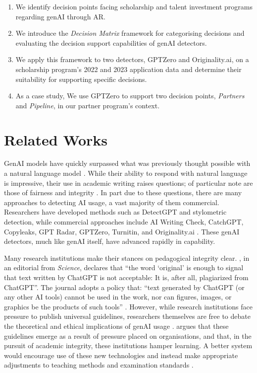\begin{enumerate}
    \item We identify decision points facing scholarship and talent investment programs regarding genAI through AR.
    \item We introduce the \emph{Decision Matrix} framework for categorising decisions and evaluating the decision support capabilities of genAI detectors.
    \item We apply this framework to two detectors, GPTZero and Originality.ai, on a scholarship program's 2022 and 2023 application data and determine their suitability for supporting specific decisions.
    \item As a case study, We use GPTZero to support two decision points, \emph{Partners} and \emph{Pipeline}, in our partner program's context.
\end{enumerate}

\section{Related Works}\label{sec:rw}
GenAI models have quickly surpassed what was previously thought possible with a natural language model \cite{brown_language_2020,chowdhery_palm_2022,openai_gpt-4_2023}. While their ability to respond with natural language is impressive, their use in academic writing raises questions; of particular note are those of fairness and integrity \cite{hu_challenges_2023}. In part due to these questions, there are many approaches to detecting AI usage, a vast majority of them commercial. Researchers have developed methods such as DetectGPT and stylometric detection, while commercial approaches include AI Writing Check, CatchGPT, Copyleaks, GPT Radar, GPTZero,  Turnitin, and Originality.ai \cite{mitchell_detectgpt_2023,kalpesh_krishna_paraphrasing_2023,tharindu_kumarage_stylometric_2023,gptzero_gptzero_2023,kirchner_new_2023}. These genAI detectors, much like genAI itself, have advanced rapidly in capability.

Many research institutions make their stances on pedagogical integrity clear. \textcite{h_holden_thorp_chatgpt_2023}, in an editorial from \emph{Science}, declares that ``the word `original' is enough to signal that text written by ChatGPT is not acceptable: It is, after all, plagiarized from ChatGPT''. The journal adopts a policy that: ``text generated by ChatGPT (or any other AI tools) cannot be used in the work, nor can figures, images, or graphics be the products of such tools'' \cite{h_holden_thorp_chatgpt_2023}. However, while research institutions face pressure to publish universal guidelines, researchers themselves are free to debate the theoretical and ethical implications of genAI usage \cite{lav_r_varshney_limits_2020,h_holden_thorp_chatgpt_2023,yu_huang_reflection_2023,weber-wulff_testing_2023,otterbacher_why_2023}. \textcite{yu_huang_reflection_2023} argues that these guidelines emerge as a result of pressure placed on organisations, and that, in the pursuit of academic integrity, these institutions hamper learning. A better system would encourage use of these new technologies and instead make appropriate adjustments to teaching methods and examination standards 
\cite{yu_huang_reflection_2023}. 

